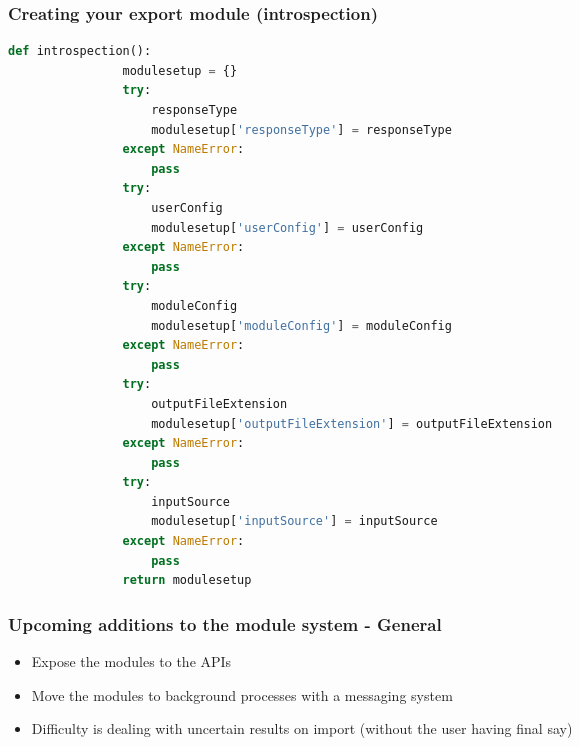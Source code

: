 \begin{frame}[fragile]
    \frametitle{Creating your export module (introspection)}
    \begin{adjustbox}{width=\textwidth,height=5cm,keepaspectratio}
        \begin{lstlisting}[language=python]
            def introspection():
                modulesetup = {}
                try:
                    responseType
                    modulesetup['responseType'] = responseType
                except NameError:
                    pass
                try:
                    userConfig
                    modulesetup['userConfig'] = userConfig
                except NameError:
                    pass
                try:
                    moduleConfig
                    modulesetup['moduleConfig'] = moduleConfig
                except NameError:
                    pass
                try:
                    outputFileExtension
                    modulesetup['outputFileExtension'] = outputFileExtension
                except NameError:
                    pass
                try:
                    inputSource
                    modulesetup['inputSource'] = inputSource
                except NameError:
                    pass
                return modulesetup
        \end{lstlisting}
    \end{adjustbox}
\end{frame}


\begin{frame}[fragile]
    \frametitle{Upcoming additions to the module system - General}
    \begin{itemize}
        \item Expose the modules to the APIs
        \item Move the modules to background processes with a messaging system
        \item Difficulty is dealing with uncertain results on import (without the user having final say)
    \end{itemize}
\end{frame}

